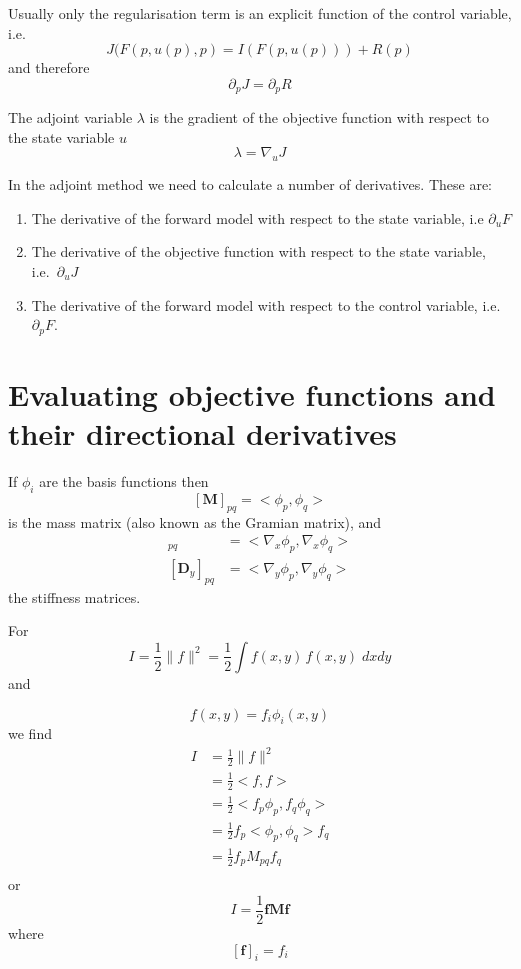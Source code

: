 \documentclass[10pt,a4paper]{book}
\newcommand{\p}{\partial}
\begin{document}
 Usually only the regularisation term is an explicit function of the
 control variable, i.e.
\[
 J(F(p,u(p),p)=I(F(p,u(p)))+R(p)
\]
and therefore
\[
  \p_p J=  \p_p R 
\]

The adjoint variable $\lambda$ is the gradient of the objective
function with respect to the state variable $u$
\[
\lambda= \nabla_u J
\] 


In the adjoint method we need to calculate a number of derivatives. These are:
\begin{enumerate}
\item The derivative of the forward model with respect to the state variable, i.e $\p_u F $
\item The derivative of the objective function with respect to the state variable, i.e.\ $\p_u J$
\item The derivative of the forward model with respect to the control variable, i.e.\ $\p_p F$.
\end{enumerate}

\section{Evaluating objective functions and their directional derivatives}
\label{sec:gradev}
If $\phi_i$ are the basis functions then
\[
[\bm{M}]_{pq}=<\phi_p , \phi_q>
\]
is the mass matrix (also known as the Gramian matrix), and
\begin{align*}
[\bm{D}_x]_{pq} & =< \nabla_x \phi_p , \nabla_x \phi_q>\\
[\bm{D}_y]_{pq} & =< \nabla_y \phi_p , \nabla_y \phi_q>
\end{align*}
the stiffness matrices.

For 
\begin{equation}
I = \frac{1}{2} \| f \|^2 = \frac{1}{2} \int f(x,y) \, f(x,y)\; dx dy
\label{eq:I1}
\end{equation}
 and

\[
f(x,y)=f_i \phi_i(x,y)
\]
we find
\begin{align*}
I &= \frac{1}{2} \| f \|^2 \\
  &=  \frac{1}{2} < f , f> \\
  &= \frac{1}{2} < f_p \phi_p , f_q \phi_q>\\
  &= \frac{1}{2} f_p <  \phi_p , \phi_q> f_q\\
  &= \frac{1}{2} f_p M_{pq} f_q\\
\end{align*}
or
\[
I = \frac{1}{2} \bm{f} \bm{M} \bm{f}
\]
where
\[
[\bm{f}]_i =f_i 
\]
\end{document}
